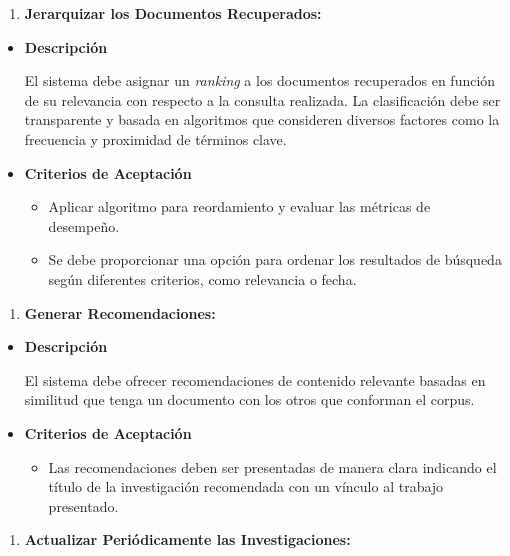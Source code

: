 \documentclass[
  12pt,
  openany]{book}
\providecommand{\tightlist}{%
  \setlength{\itemsep}{0pt}\setlength{\parskip}{0pt}}
\begin{document}
\begin{enumerate}
\def\labelenumi{\arabic{enumi}.}
\setcounter{enumi}{4}
\tightlist
\item
  \textbf{Jerarquizar los Documentos Recuperados:}
\end{enumerate}

\begin{itemize}
\item
  \textbf{Descripción}

  El sistema debe asignar un \emph{ranking} a los documentos recuperados en función de su relevancia con respecto a la consulta realizada. La clasificación debe ser transparente y basada en algoritmos que consideren diversos factores como la frecuencia y proximidad de términos clave.
\item
  \textbf{Criterios de Aceptación}

  \begin{itemize}
  \item
    Aplicar algoritmo para reordamiento y evaluar las métricas de desempeño.
  \item
    Se debe proporcionar una opción para ordenar los resultados de búsqueda según diferentes criterios, como relevancia o fecha.
  \end{itemize}
\end{itemize}

\begin{enumerate}
\def\labelenumi{\arabic{enumi}.}
\setcounter{enumi}{5}
\tightlist
\item
  \textbf{Generar Recomendaciones:}
\end{enumerate}

\begin{itemize}
\item
  \textbf{Descripción}

  El sistema debe ofrecer recomendaciones de contenido relevante basadas en similitud que tenga un documento con los otros que conforman el corpus.
\item
  \textbf{Criterios de Aceptación}

  \begin{itemize}
  \tightlist
  \item
    Las recomendaciones deben ser presentadas de manera clara indicando el título de la investigación recomendada con un vínculo al trabajo presentado.
  \end{itemize}
\end{itemize}

\begin{enumerate}
\def\labelenumi{\arabic{enumi}.}
\setcounter{enumi}{6}
\tightlist
\item
  \textbf{Actualizar Periódicamente las Investigaciones:}
\end{enumerate}
\end{document}
